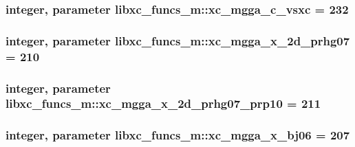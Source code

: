 \hypertarget{classlibxc__funcs__m_ad82b075333673603ec9ffe11b5d01c31}{
\subsubsection[{xc\-\_\-mgga\-\_\-c\-\_\-vsxc}]{\setlength{\rightskip}{0pt plus 5cm}integer, parameter libxc\-\_\-funcs\-\_\-m\-::xc\-\_\-mgga\-\_\-c\-\_\-vsxc = 232}}\label{classlibxc__funcs__m_ad82b075333673603ec9ffe11b5d01c31}
\hypertarget{classlibxc__funcs__m_a4169667a0e0c669e2e977ebaad4fe747}{
\subsubsection[{xc\-\_\-mgga\-\_\-x\-\_\-2d\-\_\-prhg07}]{\setlength{\rightskip}{0pt plus 5cm}integer, parameter libxc\-\_\-funcs\-\_\-m\-::xc\-\_\-mgga\-\_\-x\-\_\-2d\-\_\-prhg07 = 210}}\label{classlibxc__funcs__m_a4169667a0e0c669e2e977ebaad4fe747}
\hypertarget{classlibxc__funcs__m_aa9336b7440e3578ed201895e558ebcc9}{
\subsubsection[{xc\-\_\-mgga\-\_\-x\-\_\-2d\-\_\-prhg07\-\_\-prp10}]{\setlength{\rightskip}{0pt plus 5cm}integer, parameter libxc\-\_\-funcs\-\_\-m\-::xc\-\_\-mgga\-\_\-x\-\_\-2d\-\_\-prhg07\-\_\-prp10 = 211}}\label{classlibxc__funcs__m_aa9336b7440e3578ed201895e558ebcc9}
\hypertarget{classlibxc__funcs__m_a6760ccba47e54232ab744869ed22e4d0}{
\subsubsection[{xc\-\_\-mgga\-\_\-x\-\_\-bj06}]{\setlength{\rightskip}{0pt plus 5cm}integer, parameter libxc\-\_\-funcs\-\_\-m\-::xc\-\_\-mgga\-\_\-x\-\_\-bj06 = 207}}\label{classlibxc__funcs__m_a6760ccba47e54232ab744869ed22e4d0}
